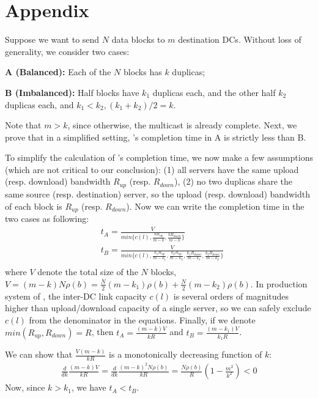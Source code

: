 \section{Appendix}

Suppose we want to send $N$ data blocks to $m$ destination DCs. Without 
loss of generality, we consider two cases:
\begin{packeditemize}
\item {\bf A (Balanced):} Each of the $N$ blocks has $k$ duplicas;
\item {\bf B (Imbalanced):} Half blocks have $k_1$ duplicas each, and the 
other half $k_2$ duplicas each, and $k_1<k_2, (k_1+k_2)/2=k$.
\end{packeditemize}
Note that $m>k$, since otherwise, the multicast is already complete.
Next, we prove that in a simplified setting, \name's completion time in A
is strictly less than B.

To simplify the calculation of \name's completion time, we now make a few
assumptions (which are not critical to our conclusion): (1) all servers 
have the same upload (resp. download) bandwidth $R_{up}$ (resp. $R_{down}$), 
(2) no two duplicas share the same source (resp. destination) server, so 
the upload (resp. download) bandwidth of each block is $R_{up}$ (resp. 
$R_{down}$).
Now we can write the completion time in the two cases as following:
\begin{equation}
\label{equa:caseK}
\begin{split}
& t_A = \frac{V}{min\{c(l),\frac{k R_{up}}{m-k},
\frac{k R_{down}}{m-k}\}}\\
& t_B = \frac{V}{min\{c(l),
\frac{k_1 R_{up}}{m-k_1},
\frac{k_2 R_{up}}{m-k_2},
\frac{k_1 R_{down}}{m-k_1},
\frac{k_2 R_{down}}{m-k_2}\}}\\
\end{split}
\end{equation}
where $V$ denote the total size of the $N$ blocks, 
$V=(m-k)N\rho(b)=
\frac{N}{2}(m-k_1)\rho(b)+\frac{N}{2}(m-k_2) \rho(b)$.
In production system of \company, the inter-DC link capacity $c(l)$ is 
several orders of magnitudes higher than upload/download capacity of a 
single server, so we can safely exclude $c(l)$ from the denominator in the
equations.
Finally, if we denote $min(R_{up},R_{down})=R$, then 
$t_A=\frac{(m-k)V}{k R}$ and 
$t_B=\frac{(m-k_1)V}{k_1 R}$.

We can show that $\frac{V(m-k)}{k R}$ is a monotonically decreasing
function of $k$:
\begin{equation}
\label{calculus}
\begin{split}
\frac{d}{dk}\frac{(m-k)V}{k R}
=\frac{d}{dk}\frac{(m-k)^2N\rho(b)}{k R}
=\frac{N \rho(b)}{R}  (1-\frac{m^2}{k^2})<0
\end{split}
\end{equation}
Now, since $k>k_1$, we have $t_A<t_B$. 

